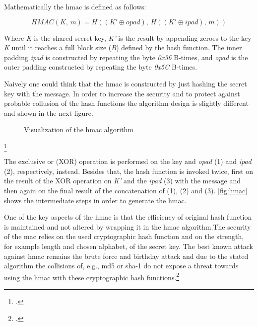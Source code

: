 Mathematically the \gls{hmac} is defined as follows:

\begin{equation*}
	HMAC(K,\, m) = H((K' \oplus opad),\, H((K' \oplus ipad),\, m))
\end{equation*}

Where \textit{K} is the shared secret key, \textit{K'} is the result by appending zeroes to the key \textit{K} until it reaches a full block size (\textit{B}) defined by the hash function. The inner padding \textit{ipad} is constructed by repeating the byte \textit{0x36} B-times, and \textit{opad} is the outer padding constructed by repeating the byte \textit{0x5C} B-times.

Naively one could think that the \gls{hmac} is constructed by just hashing the secret key with the message. In order to increase the security and to protect against probable collusion of the hash functions the algorithm design is slightly different and shown in the next figure.

\newpage

\begin{figure}[hbt]
	\centering
	
	\caption[Visualization of the \gls{hmac} algorithm]{Visualization of the \gls{hmac} algorithm\footnotemark}
	\label{fig:hmac}
\end{figure}
\footcitetext[Source: diagram by author, based on][395]{eckert-it-sec-9}

The exclusive or (XOR) operation is performed on the key and \textit{opad} (1) and \textit{ipad} (2), respectively, instead. Besides that, the hash function is invoked twice, first on the result of the XOR operation on \textit{K'} and the \textit{ipad} (3) with the message and then again on the final result of the concatenation of (1), (2) and (3). \autoref{fig:hmac} shows the intermediate steps in order to generate the \gls{hmac}.

One of the key aspects of the \gls{hmac} is that the efficiency of original hash function is maintained and not altered by wrapping it in the \gls{hmac} algorithm.The security of the \gls{mac} relies on the used cryptographic hash function and on the strength, for example length and chosen alphabet, of the secret key. The best known attack against \gls{hmac} remains the brute force and birthday attack and due to the stated algorithm the collisions of, e.g., \gls{md}5 or \gls{sha}-1 do not expose a threat towards using the \gls{hmac} with these cryptographic hash functions.\footcites[See][Chapter 10.4.1]{2308830}[See][398]{1679747}[See][3, 10--13]{10.1007/3-540-68697-5_1}[See][]{10.1007/3-540-44750-4_1}

